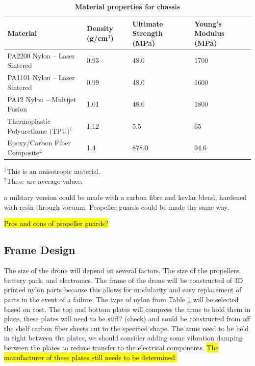 \begin{table}[ht]
	\centering
	\caption[Material Properties]{\bfseries{Material properties for chassis}}
	\label{tab:material}
	\vspace{5pt}
	\begin{tabularx}{\textwidth}{Xp{2.5cm}p{2.5cm}p{2.5cm}}	
		\toprule[2pt]
		\textbf{Material} & \textbf{Density (g/cm$^3$)} & \textbf{Ultimate Strength (MPa)} & \textbf{Young’s Modulus (MPa)}\\
		\toprule[2pt]
		PA2200 Nylon – Laser Sintered & 0.93 & 48.0 & 1700 \\
		\hline
		PA1101 Nylon – Laser Sintered & 0.99 & 48.0 & 1600\\
		\hline
		PA12 Nylon – Multijet Fusion & 1.01 & 48.0 & 1800\\
		\hline
		Thermoplastic Polyurethane (TPU)$^1$ & 1.12 & 5.5 & 65 \\
		\hline
		Epoxy/Carbon Fiber Composite$^2$ & 1.4 & 878.0 & 94.6 \\
		\hline
	\end{tabularx}
\end{table}
\noindent
$^1$This is an anisotropic material.\\
$^2$These are average values.


a military version could be made with a carbon fibre and kevlar blend, hardened with resin through vacuum. Propeller guards could be made the same way. 

\hl{Pros and cons of propeller guards?}

\subsection{Frame Design}
The size of the drone will depend on several factors. The size of the propellers, battery pack, and electronics. 
The frame of the drone will be constructed of 3D printed nylon parts because this allows for modularity and easy replacement of parts in the event of a failure. The type of nylon from Table \ref{tab:material} will be selected based on cost. 
The top and bottom plates will compress the arms to hold them in place,  these plates will need to be stiff? (check) and could be constructed from off the shelf carbon fiber sheets cut to the specified shape. The arms need to be held in tight between the plates, we should consider adding some vibration damping between the plates to reduce transfer to the electrical components. \hl{The manufacturer of these plates still needs to be determined.} 

